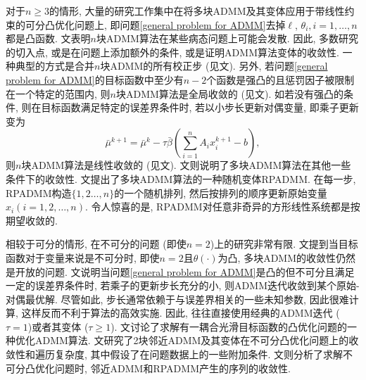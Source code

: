 \par 对于$n\ge3$的情形, 大量的研究工作集中在将多块ADMM及其变体应用于带线性约束的可分凸优化问题上, 即问题\eqref{general problem for ADMM}去掉$\ell$, $\theta_i,i=1,\ldots,n$都是凸函数. 文\cite{Chen2016The}表明$n$块ADMM算法在某些病态问题上可能会发散. 因此, 多数研究的切入点, 或是在问题上添加额外的条件, 或是证明ADMM算法变体的收敛性. 一种典型的方式是合并$n$块ADMM的所有校正步 (见文\cite{He2012Alternating,He2012On,He2015A}). 另外, 若问题\eqref{general problem for ADMM}的目标函数中至少有$n-2$个函数是强凸的且惩罚因子被限制在一个特定的范围内, 则$n$块ADMM算法是全局收敛的 (见文\cite{Cai2017On,Chen2013On,Han2013An,Li2015A,Lin2015On,Zhang2010Convergence}). 如若没有强凸的条件, 则在目标函数满足特定的误差界条件时, 若以小步长更新对偶变量, 即乘子更新变为
$$\bar\mu^{k+1}=\bar\mu^k-\tau\bar\beta\left(\sum\limits_{i=1}^nA_ix_i^{k+1}-b\right),$$
则$n$块ADMM算法是线性收敛的 (见文\cite{Hong2017On}). 文\cite{Lin2016Iteration,Lin2015Onthe}则说明了多块ADMM算法在其他一些条件下的收敛性. 文\cite{Sun2015On}提出了多块ADMM算法的一种随机变体RPADMM. 在每一步, RPADMM构造$\{1,2\ldots,n\}$的一个随机排列, 然后按排列的顺序更新原始变量$x_i(i=1,2,\ldots,n)$. 令人惊喜的是, RPADMM对任意非奇异的方形线性系统都是按期望收敛的.
\par 相较于可分的情形, 在不可分的问题 (即使$n=2$)上的研究非常有限. 文\cite{Hong2016COnvergence}提到当目标函数对于变量来说是不可分时, 即使$n=2$且$\theta(\cdot)$为凸, 多块ADMM的收敛性仍然是开放的问题. 文\cite{Hong2014A}说明当问题\eqref{general problem for ADMM}是凸的但不可分且满足一定的误差界条件时, 若乘子的更新步长充分的小, 则ADMM迭代收敛到某个原始-对偶最优解. 尽管如此, 步长通常依赖于与误差界相关的一些未知参数, 因此很难计算, 这样反而不利于算法的高效实施. 因此, 往往直接使用经典的ADMM迭代 ($\tau=1$)或者其变体 ($\tau\ge1$). 文\cite{Cui2016On}讨论了求解有一耦合光滑目标函数的凸优化问题的一种优化ADMM算法. 文\cite{Gao2017First}研究了2块邻近ADMM及其变体在不可分凸优化问题上的收敛性和遍历复杂度, 其中假设了在问题数据上的一些附加条件. 文\cite{Chen2019Extended}则分析了求解不可分凸优化问题时, 邻近ADMM和RPADMM产生的序列的收敛性.
